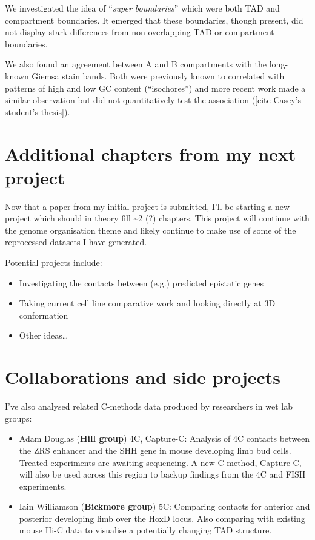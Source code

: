 \documentclass[a4paper,10pt,oneside]{book}
\begin{document}
We investigated the idea of ``\emph{super boundaries}'' which were both
TAD and compartment boundaries. It emerged that these boundaries, though
present, did not display stark differences from non-overlapping TAD or
compartment boundaries.

We also found an agreement between A and B compartments with the
long-known Giemsa stain bands. Both were previously known to correlated
with patterns of high and low GC content (``isochores'') and more recent
work made a similar observation but did not quantitatively test the
association ({[}cite Casey's student's thesis{]}).

\section{Additional chapters from my next
project}\label{additional-chapters-from-my-next-project}

Now that a paper from my initial project is submitted, I'll be starting
a new project which should in theory fill \textasciitilde{}2 (?)
chapters. This project will continue with the genome organisation theme
and likely continue to make use of some of the reprocessed datasets I
have generated.

Potential projects include:

\begin{itemize}
\itemsep1pt\parskip0pt
\item
  Investigating the contacts between (e.g.) predicted epistatic genes
\item
  Taking current cell line comparative work and looking directly at 3D
  conformation
\item
  Other ideas\ldots
\end{itemize}

\section{Collaborations and side
projects}\label{collaborations-and-side-projects}

I've also analysed related C-methods data produced by researchers in wet
lab groups:

\begin{itemize}
\item
  Adam Douglas (\textbf{Hill group}) 4C, Capture-C: Analysis of 4C
  contacts between the ZRS enhancer and the SHH gene in mouse developing
  limb bud cells. Treated experiments are awaiting sequencing. A new
  C-method, Capture-C, will also be used across this region to backup
  findings from the 4C and FISH experiments.
\item
  Iain Williamson (\textbf{Bickmore group}) 5C: Comparing contacts for
  anterior and posterior developing limb over the HoxD locus. Also
  comparing with existing mouse Hi-C data to visualise a potentially
  changing TAD structure.
\end{itemize}
\end{document}
